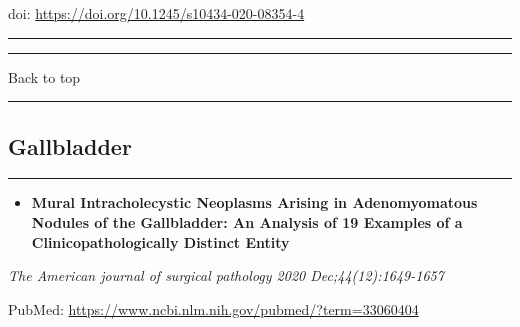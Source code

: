 \documentclass[
]{article}
\providecommand{\tightlist}{%
  \setlength{\itemsep}{0pt}\setlength{\parskip}{0pt}}
\begin{document}
doi: \url{https://doi.org/10.1245/s10434-020-08354-4}

\begin{center}\rule{0.5\linewidth}{0.5pt}\end{center}

\begin{center}\rule{0.5\linewidth}{0.5pt}\end{center}

Back to top

\begin{center}\rule{0.5\linewidth}{0.5pt}\end{center}

\pagebreak

\hypertarget{gallbladder}{%
\subsection{Gallbladder}\label{gallbladder}}

\begin{center}\rule{0.5\linewidth}{0.5pt}\end{center}

\begin{itemize}
\tightlist
\item
  \textbf{Mural Intracholecystic Neoplasms Arising in Adenomyomatous
  Nodules of the Gallbladder: An Analysis of 19 Examples of a
  Clinicopathologically Distinct Entity}
\end{itemize}

\emph{The American journal of surgical pathology 2020
Dec;44(12):1649-1657}

PubMed: \url{https://www.ncbi.nlm.nih.gov/pubmed/?term=33060404}
\end{document}
